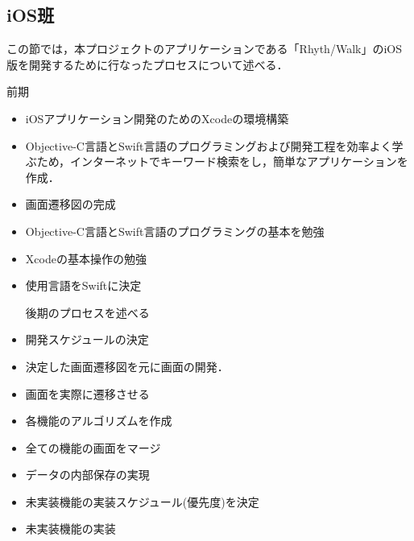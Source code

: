 \subsection{iOS班}
\par この節では，本プロジェクトのアプリケーションである「Rhyth/Walk」のiOS版を開発するために行なったプロセスについて述べる．
\par 前期
\begin{itemize}
\item iOSアプリケーション開発のためのXcodeの環境構築
\item Objective-C言語とSwift言語のプログラミングおよび開発工程を効率よく学ぶため，インターネットでキーワード検索をし，簡単なアプリケーションを作成．
\item 画面遷移図の完成
\item Objective-C言語とSwift言語のプログラミングの基本を勉強
\item Xcodeの基本操作の勉強
\item 使用言語をSwiftに決定

\par 後期のプロセスを述べる
\item 開発スケジュールの決定
\item 決定した画面遷移図を元に画面の開発．
\item 画面を実際に遷移させる
\item 各機能のアルゴリズムを作成
\item 全ての機能の画面をマージ
\item データの内部保存の実現
\item 未実装機能の実装スケジュール(優先度)を決定
\item 未実装機能の実装
 \end{itemize}
